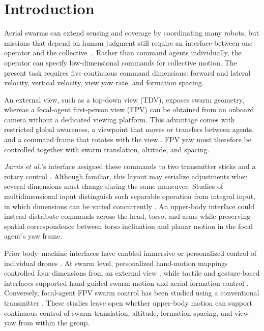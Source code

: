 \documentclass[a4paper,10pt,conference]{ieeeconf}
\begin{document}
\section{Introduction}




Aerial swarms can extend sensing and coverage by coordinating many robots, but
missions that depend on human judgment still require an interface between one
operator and the collective
\cite{kolling2016survey,hocraffer2017meta,ben_focaldrone}.. Rather than command agents
individually, the operator can specify low-dimensional commands for collective
motion.
The present task requires five continuous command dimensions: forward and
lateral velocity, vertical velocity, view yaw rate, and formation spacing.


An external view, such as a top-down view (TDV), exposes swarm geometry, whereas a focal-agent first-person
view (FPV) can be obtained from an onboard camera without a dedicated viewing
platform. This advantage comes with restricted global awareness, a viewpoint
that moves or transfers between agents, and a command frame that rotates with
the view \cite{ben_focaldrone,macchini2021impact}. FPV yaw must therefore be
controlled together with swarm translation, altitude, and spacing.

\textit{Jarvis et al.}'s interface assigned these commands to two
transmitter sticks and a rotary control \cite{ben_focaldrone}. Although
familiar, this layout may serialize adjustments when several dimensions must
change during the same maneuver. Studies of multidimensional input distinguish
such separable operation from integral input, in which dimensions can be varied
concurrently \cite{jacob1994integrality,zhai1998quantifying}. An upper-body
interface could instead distribute commands across the head, torso, and arms
while preserving spatial correspondence between torso inclination and planar
motion in the focal agent's yaw frame.

Prior body--machine interfaces have enabled immersive or personalized control
of individual drones
\cite{rognon2018flyjacket,miehlbradt2018datadriven,macchini2024datadriven}.
At swarm level, personalized hand-motion mappings controlled four dimensions
from an external view \cite{macchini2021personalized}, while tactile and
gesture-based interfaces supported hand-guided swarm motion and aerial-formation
control \cite{tsykunov2019swarmtouch,kratky2025gesture}. Conversely,
focal-agent FPV swarm control has been studied using a conventional transmitter
\cite{ben_focaldrone}. These studies leave open whether upper-body motion can
support continuous control of swarm translation, altitude, formation spacing,
and view yaw from within the group.
\end{document}
